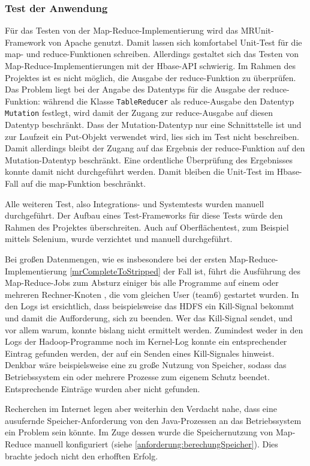 \subsubsection{Test der Anwendung}

Für das Testen von der Map-Reduce-Implementierung wird das MRUnit-Framework von Apache
\cite{mrunit} genutzt. Damit lassen sich komfortabel Unit-Test für die map- und reduce-Funktionen
schreiben. Allerdings gestaltet sich das Testen von Map-Reduce-Implementierungen mit
der Hbase-API schwierig. Im Rahmen des Projektes ist es nicht möglich, die Ausgabe der
reduce-Funktion zu überprüfen. Das Problem liegt bei der Angabe des Datentyps für
die Ausgabe der reduce-Funktion: während die Klasse \texttt{TableReducer} als reduce-Ausgabe
den Datentyp \texttt{Mutation} festlegt, wird damit der Zugang zur reduce-Ausgabe auf diesen
Datentyp beschränkt. Dass der Mutation-Datentyp nur eine Schnittstelle ist und zur
Laufzeit ein Put-Objekt verwendet wird, lies sich im Test nicht beschreiben.
Damit allerdings bleibt der Zugang auf das Ergebnis der reduce-Funktion auf den
Mutation-Datentyp beschränkt. Eine ordentliche Überprüfung des Ergebnisses konnte damit
nicht durchgeführt werden. Damit bleiben die Unit-Test im Hbase-Fall auf die map-Funktion
beschränkt. 

Alle weiteren Test, also Integrations- und Systemtests wurden manuell durchgeführt.
Der Aufbau eines Test-Frameworks für diese Tests würde den Rahmen des Projektes 
überschreiten. Auch auf Oberflächentest, zum Beispiel mittels Selenium, wurde verzichtet
und manuell durchgeführt.

Bei großen Datenmengen, wie es insbesondere bei der ersten Map-Reduce-Implementierung \ref{mrCompleteToStripped} der Fall ist,
führt die Ausführung des Map-Reduce-Jobs zum Absturz einiger bis alle Programme auf einem oder mehreren Rechner-Knoten
, die vom gleichen User (team6) gestartet wurden.
In den Logs ist ersichtlich, dass beispielsweise das HDFS ein Kill-Signal bekommt und damit die Aufforderung, sich zu beenden.
Wer das Kill-Signal sendet, und vor allem warum, konnte bislang nicht ermittelt werden. Zumindest weder in den Logs der 
Hadoop-Programme noch im Kernel-Log konnte ein entsprechender Eintrag gefunden werden, der auf ein Senden eines
Kill-Signales hinweist. Denkbar wäre beispielsweise eine zu große Nutzung von Speicher, sodass das Betriebssystem ein
oder mehrere Prozesse zum eigenem Schutz beendet. Entsprechende Einträge wurden aber nicht gefunden.

Recherchen im Internet legen aber weiterhin den Verdacht nahe, dass eine ausufernde Speicher-Anforderung von den Java-Prozessen
an das Betriebssystem ein Problem sein könnte. Im Zuge dessen wurde die Speichernutzung von Map-Reduce manuell konfiguriert 
(siehe \ref{anforderung:berechungSpeicher}). Dies brachte jedoch nicht den erhofften Erfolg.

